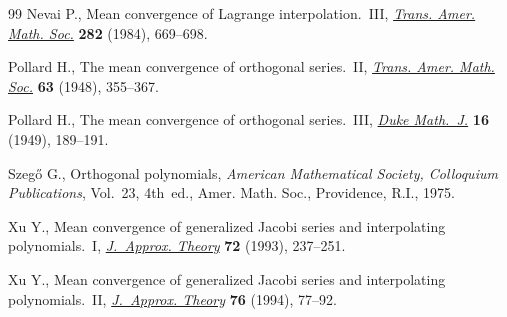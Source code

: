\documentclass[11pt]{article}
\numberwithin{equation}{section}
\begin{document}
\begin{thebibliography}{99}
Nevai P., Mean convergence of {L}agrange interpolation.~{III}, \href{https://doi.org/10.2307/1999259}{\textit{Trans.
 Amer. Math. Soc.}} \textbf{282} (1984), 669--698.

Pollard H., The mean convergence of orthogonal series.~{II}, \href{https://doi.org/10.2307/1990435}{\textit{Trans.
 Amer. Math. Soc.}} \textbf{63} (1948), 355--367.

Pollard H., The mean convergence of orthogonal series.~{III}, \href{https://doi.org/10.1215/S0012-7094-49-01619-1}{\textit{Duke
 Math.~J.}} \textbf{16} (1949), 189--191.

Szeg\H{o} G., Orthogonal polynomials, \textit{American Mathematical Society,
 Colloquium Publications}, Vol.~23, 4th~ed., Amer. Math. Soc., Providence, R.I., 1975.

Xu Y., Mean convergence of generalized {J}acobi series and interpolating
 polynomials.~{I}, \href{https://doi.org/10.1006/jath.1993.1019}{\textit{J.~Approx. Theory}} \textbf{72} (1993), 237--251.

Xu Y., Mean convergence of generalized {J}acobi series and interpolating
 polynomials.~{II}, \href{https://doi.org/10.1006/jath.1994.1006}{\textit{J.~Approx. Theory}} \textbf{76} (1994), 77--92.

\end{thebibliography}
\end{document}
